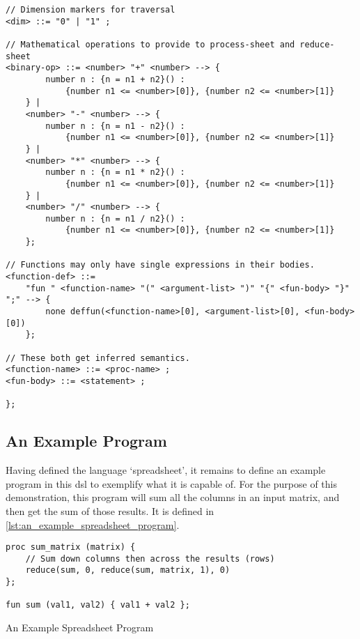 \begin{verbatim}
// Dimension markers for traversal
<dim> ::= "0" | "1" ;

// Mathematical operations to provide to process-sheet and reduce-sheet
<binary-op> ::= <number> "+" <number> --> {
        number n : {n = n1 + n2}() :
            {number n1 <= <number>[0]}, {number n2 <= <number>[1]}
    } |
    <number> "-" <number> --> {
        number n : {n = n1 - n2}() :
            {number n1 <= <number>[0]}, {number n2 <= <number>[1]}
    } |
    <number> "*" <number> --> {
        number n : {n = n1 * n2}() :
            {number n1 <= <number>[0]}, {number n2 <= <number>[1]}
    } |
    <number> "/" <number> --> {
        number n : {n = n1 / n2}() :
            {number n1 <= <number>[0]}, {number n2 <= <number>[1]}
    };

// Functions may only have single expressions in their bodies. 
<function-def> ::= 
    "fun " <function-name> "(" <argument-list> ")" "{" <fun-body> "}" ";" --> {
        none deffun(<function-name>[0], <argument-list>[0], <fun-body>[0])
    };

// These both get inferred semantics.
<function-name> ::= <proc-name> ;
<fun-body> ::= <statement> ;

};

\end{verbatim}



\subsection{An Example Program} %
\label{sub:an_example_program}
Having  defined the language `spreadsheet', it remains to define an example program in this \gls{dsl} to exemplify what it is capable of.
For the purpose of this demonstration, this program will sum all the columns in an input matrix, and then get the sum of those results. 
It is defined in \autoref{lst:an_example_spreadsheet_program}.

\begin{listing}[!htb]
\begin{verbatim}
proc sum_matrix (matrix) {
    // Sum down columns then across the results (rows)
    reduce(sum, 0, reduce(sum, matrix, 1), 0)
};

fun sum (val1, val2) { val1 + val2 };
\end{verbatim}
\caption{An Example Spreadsheet Program}
\label{lst:an_example_spreadsheet_program}
\end{listing}

